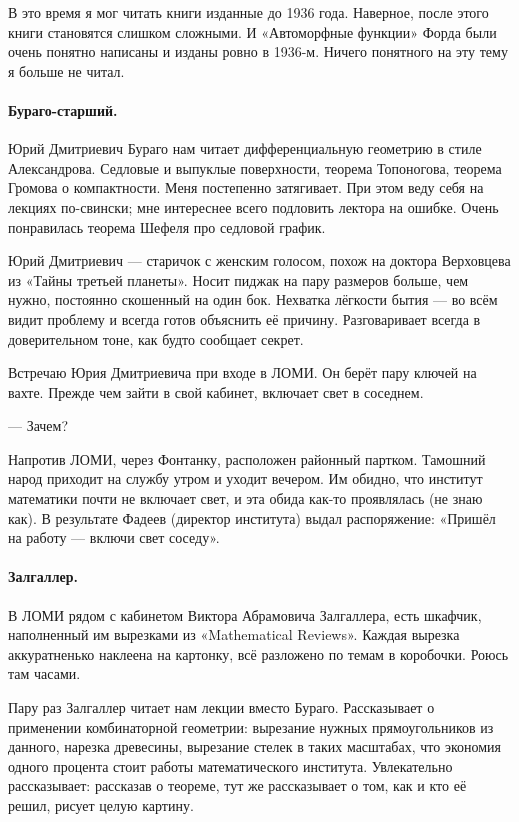 \documentclass{book}
\begin{document}
В это время я мог читать книги изданные до 1936 года.
Наверное, после этого книги становятся слишком сложными.
И «Автоморфные функции» Форда были очень понятно написаны и изданы ровно в 1936-м.
Ничего понятного на эту тему я больше не читал.

\paragraph{Бураго-старший.}
Юрий Дмитриевич Бураго нам читает дифференциальную геометрию в стиле Александрова.
Седловые и выпуклые поверхности,
теорема Топоногова, 
теорема Громова о компактности.
Меня постепенно затягивает.
При этом веду себя на лекциях по-свински;
мне интереснее всего подловить лектора на ошибке.
Очень понравилась теорема Шефеля про седловой график.

Юрий Дмитриевич --- старичок с женским голосом,
похож на доктора Верховцева из «Тайны третьей планеты».
Носит пиджак на пару размеров больше, чем нужно,
постоянно скошенный на один бок.
Нехватка лёгкости бытия --- во всём видит проблему и всегда готов объяснить её причину.
Разговаривает всегда в доверительном тоне,
как будто сообщает секрет.

Встречаю Юрия Дмитриевича при входе в ЛОМИ.
Он берёт пару ключей на вахте.
Прежде чем зайти в свой кабинет, включает свет в соседнем.

--- Зачем?

Напротив ЛОМИ, через Фонтанку, расположен районный партком.
Тамошний народ приходит на службу утром и уходит вечером.
Им обидно, что институт математики почти не включает свет, и эта обида как-то проявлялась (не знаю как).
В результате Фадеев (директор института) выдал распоряжение: «Пришёл на работу --- включи свет соседу».

\paragraph{Залгаллер.}
В ЛОМИ рядом с кабинетом Виктора Абрамовича Залгаллера, есть шкафчик, наполненный им вырезками из  «Math\-em\-at\-ical Reviews».
Каждая вырезка аккуратненько наклеена на картонку, 
всё разложено по темам в коробочки.
Роюсь там часами.

Пару раз Залгаллер читает нам лекции вместо Бураго.
Рассказывает о применении комбинаторной геометрии:
вырезание нужных прямоугольников из данного,
нарезка древесины,
вырезание стелек в таких масштабах, 
что экономия одного процента стоит работы математического института.
Увлекательно рассказывает: 
рассказав о теореме, тут же рассказывает о том, как и кто её решил, 
рисует целую картину.
\end{document}
